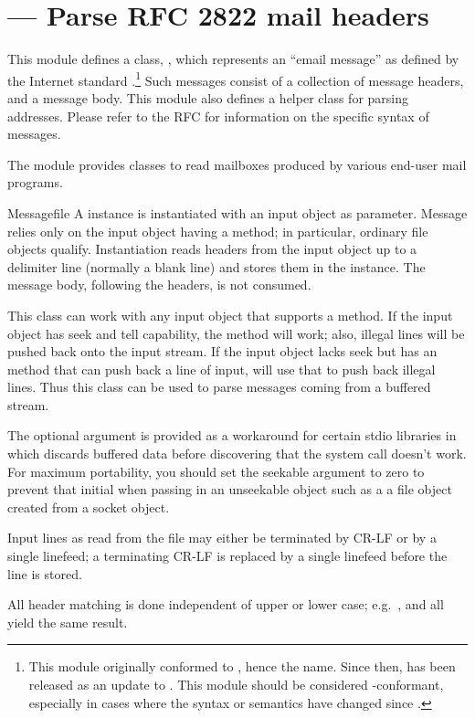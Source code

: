 \section{ ---
         Parse RFC 2822 mail headers}


This module defines a class, , which represents an
``email message'' as defined by the Internet standard
.\footnote{This module originally conformed to ,
hence the name.  Since then,  has been released as an
update to .  This module should be considered
-conformant, especially in cases where the
syntax or semantics have changed since .}  Such messages
consist of a collection of message headers, and a message body.  This
module also defines a helper class
 for parsing  addresses.  Please refer to
the RFC for information on the specific syntax of  messages.

The  module provides classes 
to read mailboxes produced by various end-user mail programs.

\begin{classdesc}{Message}{file}
A  instance is instantiated with an input object as
parameter.  Message relies only on the input object having a
 method; in particular, ordinary file objects
qualify.  Instantiation reads headers from the input object up to a
delimiter line (normally a blank line) and stores them in the
instance.  The message body, following the headers, is not consumed.

This class can work with any input object that supports a
 method.  If the input object has seek and tell
capability, the  method will work; also, illegal
lines will be pushed back onto the input stream.  If the input object
lacks seek but has an  method that can push back a
line of input,  will use that to push back illegal
lines.  Thus this class can be used to parse messages coming from a
buffered stream.

The optional  argument is provided as a workaround for
certain stdio libraries in which  discards buffered
data before discovering that the  system call
doesn't work.  For maximum portability, you should set the seekable
argument to zero to prevent that initial  when passing
in an unseekable object such as a a file object created from a socket
object.

Input lines as read from the file may either be terminated by CR-LF or
by a single linefeed; a terminating CR-LF is replaced by a single
linefeed before the line is stored.

All header matching is done independent of upper or lower case;
e.g.\ ,  and
 all yield the same result.
\end{classdesc}

